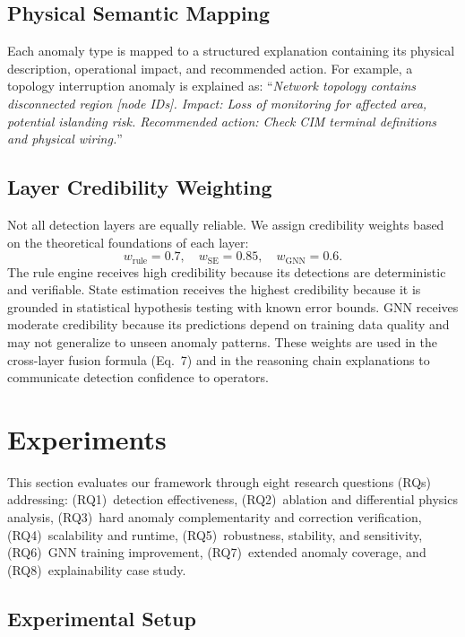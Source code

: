\documentclass[research]{fcs}
\begin{document}
\subsection{Physical Semantic Mapping}

Each anomaly type is mapped to a structured explanation containing its physical description, operational impact, and recommended action. For example, a topology interruption anomaly is explained as: ``\textit{Network topology contains disconnected region [node IDs]. Impact: Loss of monitoring for affected area, potential islanding risk. Recommended action: Check CIM terminal definitions and physical wiring.}''

\subsection{Layer Credibility Weighting}

Not all detection layers are equally reliable. We assign credibility weights based on the theoretical foundations of each layer:
\begin{equation}
w_{\text{rule}} = 0.7, \quad w_{\text{SE}} = 0.85, \quad w_{\text{GNN}} = 0.6.
\end{equation}
The rule engine receives high credibility because its detections are deterministic and verifiable. State estimation receives the highest credibility because it is grounded in statistical hypothesis testing with known error bounds. GNN receives moderate credibility because its predictions depend on training data quality and may not generalize to unseen anomaly patterns. These weights are used in the cross-layer fusion formula (Eq.~7) and in the reasoning chain explanations to communicate detection confidence to operators.

\section{Experiments}

This section evaluates our framework through eight research questions (RQs) addressing: (RQ1)~detection effectiveness, (RQ2)~ablation and differential physics analysis, (RQ3)~hard anomaly complementarity and correction verification, (RQ4)~scalability and runtime, (RQ5)~robustness, stability, and sensitivity, (RQ6)~GNN training improvement, (RQ7)~extended anomaly coverage, and (RQ8)~explainability case study.

\subsection{Experimental Setup}
\end{document}
